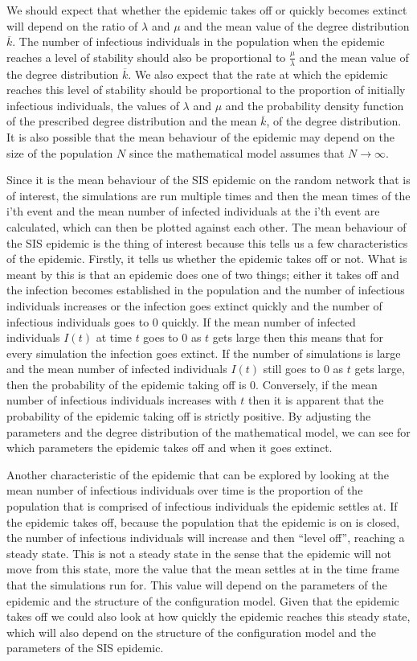 \documentclass{uonmathsreport}
\begin{document}
We should expect that whether the epidemic takes off or quickly becomes extinct will depend on the ratio of $\lambda$ and $\mu$ and the mean value of the degree distribution $\overline{k}$. The number of infectious individuals in the population when the epidemic reaches a level of stability should also be proportional to $\frac{\mu}{\lambda}$ and the mean value of the degree distribution $\overline{k}$. We also expect that the rate at which the epidemic reaches this level of stability should be proportional to the proportion of initially infectious individuals, the values of $\lambda$ and $\mu$ and the probability density function of the prescribed degree distribution and the mean $\overline{k}$, of the degree distribution. It is also possible that the mean behaviour of the epidemic may depend on the size of the population $N$ since the mathematical model assumes that $N \rightarrow \infty$.

Since it is the mean behaviour of the SIS epidemic on the random network that is of interest, the simulations are run multiple times and then the mean times of the i’th event and the mean number of infected individuals at the i'th event are calculated, which can then be plotted against each other. The mean behaviour of the SIS epidemic is the thing of interest because this tells us a few characteristics of the epidemic. Firstly, it tells us whether the epidemic takes off or not. What is meant by this is that an epidemic does one of two things; either it takes off and the infection becomes established in the population and the number of infectious individuals increases or the infection goes extinct quickly and the number of infectious individuals goes to $0$ quickly. If the mean number of infected individuals $I(t)$ at time $t$ goes to $0$ as $t$ gets large then this means that for every simulation the infection goes extinct. If the number of simulations is large and the mean number of infected individuals $I(t)$ still goes to $0$ as $t$ gets large, then the probability of the epidemic taking off is $0$. Conversely, if the mean number of infectious individuals increases with $t$ then it is apparent that the probability of the epidemic taking off is strictly positive. By adjusting the parameters and the degree distribution of the mathematical model, we can see for which parameters the epidemic takes off and when it goes extinct.

Another characteristic of the epidemic that can be explored by looking at the mean number of infectious individuals over time is the proportion of the population that is comprised of infectious individuals the epidemic settles at. If the epidemic takes off, because the population that the epidemic is on is closed, the number of infectious individuals will increase and then “level off”, reaching a steady state. This is not a steady state in the sense that the epidemic will not move from this state, more the value that the mean settles at in the time frame that the simulations run for. This value will depend on the parameters of the epidemic and the structure of the configuration model. Given that the epidemic takes off we could also look at how quickly the epidemic reaches this steady state, which will also depend on the structure of the configuration model and the parameters of the SIS epidemic.
\end{document}
